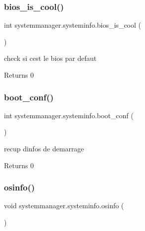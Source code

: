 \subsubsection{\texorpdfstring{bios\+\_\+is\+\_\+cool()}{bios\_is\_cool()}}
{\footnotesize\ttfamily int systemmanager.\+systeminfo.\+bios\+\_\+is\+\_\+cool (\begin{DoxyParamCaption}{ }\end{DoxyParamCaption})}



check si c\textquotesingle{}est le bios par defaut 

\begin{DoxyReturn}{Returns}
0
\end{DoxyReturn}
\mbox{\label{classsystemmanager_1_1systeminfo_af610a8922ba5c4e496b0f1a8d6a7c2e9}} 
\subsubsection{\texorpdfstring{boot\+\_\+conf()}{boot\_conf()}}
{\footnotesize\ttfamily int systemmanager.\+systeminfo.\+boot\+\_\+conf (\begin{DoxyParamCaption}{ }\end{DoxyParamCaption})}



recup d\textquotesingle{}infos de demarrage 

\begin{DoxyReturn}{Returns}
0
\end{DoxyReturn}
\mbox{\label{classsystemmanager_1_1systeminfo_a02b1119e5b013545a0c63b5d28cfe983}} 
\subsubsection{\texorpdfstring{osinfo()}{osinfo()}}
{\footnotesize\ttfamily void systemmanager.\+systeminfo.\+osinfo (\begin{DoxyParamCaption}{ }\end{DoxyParamCaption})}



